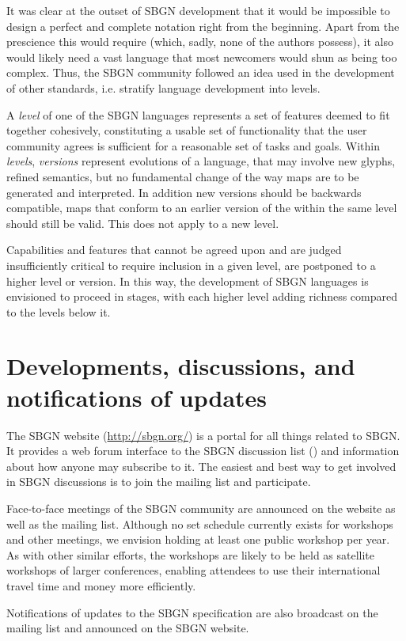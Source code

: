 It was clear at the outset of SBGN development that it would be impossible 
to design a perfect and complete notation right from the beginning.  Apart 
from the prescience this would require (which, sadly, none of the authors 
possess), it also would likely need a vast language that most newcomers 
would shun as being too complex.  Thus, the SBGN community followed an idea 
used in the development of other standards, i.e. stratify language 
development into levels.

A \emph{level} of one of the SBGN languages represents a set of
features deemed to fit together cohesively, constituting a usable set
of functionality that the user community agrees is sufficient for a
reasonable set of tasks and goals.  Within \emph{levels},
\emph{versions} represent evolutions of a language, that may
involve new glyphs, refined semantics, but no fundamental change of
the way maps are to be generated and interpreted. In addition new
versions should be backwards compatible, \ie \AF maps that conform to
an earlier version of the \AFl within the same level should still be
valid.  This does not apply to a new level.

Capabilities and features that cannot be agreed upon and are judged
insufficiently critical to require inclusion in a given level, are
postponed to a higher level or version.  In this way, the development
of SBGN languages is envisioned to proceed in stages, with each higher
level adding richness compared to the levels below it.

\section{Developments, discussions, and notifications of updates}
\label{sec:discussions}

The SBGN website (\url{http://sbgn.org/}) is a portal for all things 
related to SBGN.  It provides a web forum interface to the SBGN discussion 
list () and information about how anyone 
may subscribe to it.  The easiest and best way to get involved in SBGN 
discussions is to join the mailing list and participate.

Face-to-face meetings of the SBGN community are announced on the website as 
well as the mailing list.  Although no set schedule currently exists for 
workshops and other meetings, we envision holding at least one public 
workshop per year.  As with other similar efforts, the workshops are likely 
to be held as satellite workshops of larger conferences, enabling attendees 
to use their international travel time and money more efficiently.

Notifications of updates to the SBGN specification are also broadcast on 
the mailing list and announced on the SBGN website.
